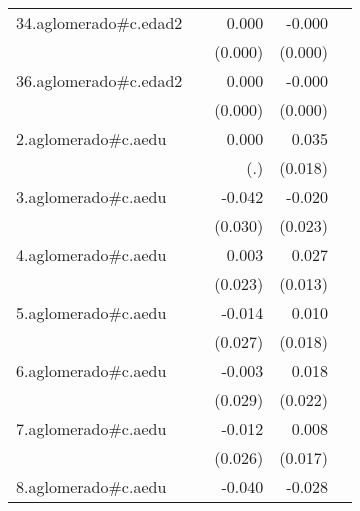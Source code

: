 {\begin{longtable}{l*{4}{D{.}{.}{-1}}}
\addlinespace
34.aglomerado#c.edad2&                     &       0.000         &      -0.000\sym{**} &                     \\
            &                     &     (0.000)         &     (0.000)         &                     \\
\addlinespace
36.aglomerado#c.edad2&                     &       0.000         &      -0.000\sym{*}  &                     \\
            &                     &     (0.000)         &     (0.000)         &                     \\
\addlinespace
2.aglomerado#c.aedu&                     &       0.000         &       0.035         &                     \\
            &                     &         (.)         &     (0.018)         &                     \\
\addlinespace
3.aglomerado#c.aedu&                     &      -0.042         &      -0.020         &                     \\
            &                     &     (0.030)         &     (0.023)         &                     \\
\addlinespace
4.aglomerado#c.aedu&                     &       0.003         &       0.027\sym{*}  &                     \\
            &                     &     (0.023)         &     (0.013)         &                     \\
\addlinespace
5.aglomerado#c.aedu&                     &      -0.014         &       0.010         &                     \\
            &                     &     (0.027)         &     (0.018)         &                     \\
\addlinespace
6.aglomerado#c.aedu&                     &      -0.003         &       0.018         &                     \\
            &                     &     (0.029)         &     (0.022)         &                     \\
\addlinespace
7.aglomerado#c.aedu&                     &      -0.012         &       0.008         &                     \\
            &                     &     (0.026)         &     (0.017)         &                     \\
\addlinespace
8.aglomerado#c.aedu&                     &      -0.040         &      -0.028         &                     \\

\end{longtable}}
